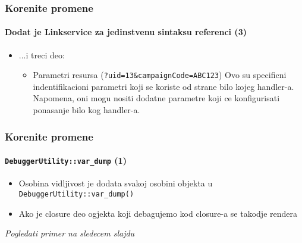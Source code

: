 \begin{frame}[fragile]
	\frametitle{Korenite promene}
	\framesubtitle{Dodat je Linkservice za jedinstvenu sintaksu referenci (3)}

	\begin{itemize}

		\item ...i treci deo:

			\begin{itemize}

				\item Parametri resursa (\texttt{?uid=13\&campaignCode=ABC123})\newline
					Ovo su specificni indentifikacioni parametri koji se koriste od strane bilo kojeg handler-a.
					Napomena, oni mogu nositi dodatne parametre koji ce konfigurisati ponasanje bilo kog handler-a.

			\end{itemize}

	\end{itemize}

\end{frame}

\begin{frame}[fragile]
	\frametitle{Korenite promene}
	\framesubtitle{\texttt{DebuggerUtility::var\_dump} (1)}

	\begin{itemize}

		\item Osobina vidljivost je dodata svakoj osobini objekta u \texttt{DebuggerUtility::var\_dump()}
			\newline

		\item Ako je closure deo ogjekta koji debagujemo kod closure-a se takodje rendera

	\end{itemize}

	\tabto{0.75cm}\textit{Pogledati primer na sledecem slajdu}

\end{frame}


